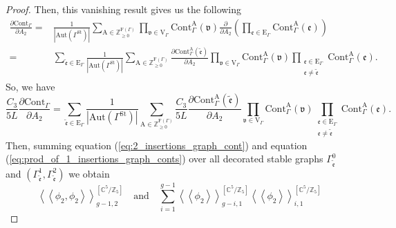 \documentclass[10pt,a4paper]{amsart}
\begin{document}
\begin{proof}
Then, this vanishing result gives us the following
\begin{equation*}
\begin{aligned}
\frac{\partial \mathrm{Cont}_{\Gamma}}{\partial A_2}
=&\frac{1}{|\mathrm{Aut}(\Gamma^{\mathrm{St}})|} \sum_{\mathrm{A} \in \mathbb{Z}_{\geq 0}^{\mathrm{F}(\Gamma)}} \prod_{\mathfrak{v} \in \mathrm{V}_{\Gamma}} \mathrm{Cont}_{\Gamma}^{\mathrm{A}}(\mathfrak{v})\frac{\partial}{\partial A_2}\left(\prod_{\mathfrak{e}\in \mathrm{E}_{\Gamma}} \mathrm{Cont}_{\Gamma}^{\mathrm{A}}(\mathfrak{e})\right)\\
=&\sum_{\tilde{\mathfrak{e}}\in \mathrm{E}_{\Gamma}}\frac{1}{|\mathrm{Aut}(\Gamma^{\mathrm{St}})|} \sum_{\mathrm{A} \in \mathbb{Z}_{\geq 0}^{\mathrm{F}(\Gamma)}}\frac{\partial \mathrm{Cont}_{\Gamma}^{\mathrm{A}}(\tilde{\mathfrak{e}}) }{\partial A_2} \prod_{\mathfrak{v} \in \mathrm{V}_{\Gamma}} \mathrm{Cont}_{\Gamma}^{\mathrm{A}}(\mathfrak{v})\prod_{\substack{
\mathfrak{e} \in \mathrm{E}_{\Gamma} \\ \mathfrak{e}\neq \tilde{\mathfrak{e}}}} \mathrm{Cont}_{\Gamma}^{\mathrm{A}}(\mathfrak{e}).
\end{aligned}
\end{equation*}
So, we have
\begin{equation}\label{eq:A2_Derivative_of_Gamma_cont}
\frac{C_{3}}{5L}\frac{\partial \mathrm{Cont}_{\Gamma}}{\partial A_2}
=\sum_{\tilde{\mathfrak{e}}\in \mathrm{E}_{\Gamma}}\frac{1}{|\mathrm{Aut}(\Gamma^{\mathrm{St}})|} \sum_{\mathrm{A} \in \mathbb{Z}_{\geq 0}^{\mathrm{F}(\Gamma)}}\frac{C_{3}}{5L}\frac{\partial \mathrm{Cont}_{\Gamma}^{\mathrm{A}}(\tilde{\mathfrak{e}}) }{\partial A_2} \prod_{\mathfrak{v} \in \mathrm{V}_{\Gamma}} \mathrm{Cont}_{\Gamma}^{\mathrm{A}}(\mathfrak{v})\prod_{\substack{
\mathfrak{e} \in \mathrm{E}_{\Gamma} \\ \mathfrak{e}\neq \tilde{\mathfrak{e}}}} \mathrm{Cont}_{\Gamma}^{\mathrm{A}}(\mathfrak{e}).
\end{equation}
Then, summing equation (\ref{eq:2_insertions_graph_cont}) and equation (\ref{eq:prod_of_1_insertions_graph_conts}) over all decorated stable graphs $\Gamma_{\tilde{\mathfrak{e}}}^0$ and $(\Gamma_{\tilde{\mathfrak{e}}}^1,\Gamma_{\tilde{\mathfrak{e}}}^2)$
we obtain
\begin{equation*}
\left\langle\left\langle\phi_{2},\phi_{2}\right\rangle\right\rangle_{g-1,2}^{\left[\mathbb{C}^5 / \mathbb{Z}_5\right]}\quad\text{and}\quad\sum_{i=1}^{g-1}\left\langle\left\langle\phi_{2}\right\rangle\right\rangle_{g-i,1}^{\left[\mathbb{C}^5 / \mathbb{Z}_5\right]}\left\langle\left\langle\phi_{2}\right\rangle\right\rangle_{i,1}^{\left[\mathbb{C}^5 / \mathbb{Z}_5\right]}

\end{equation*}
\end{proof}
\end{document}

